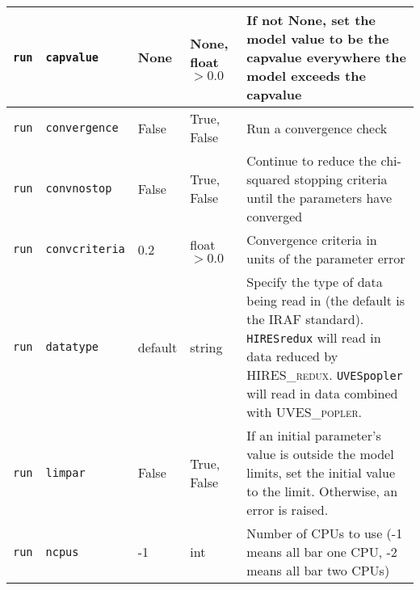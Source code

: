 \begin{center}
\begin{longtable}{p{1.5cm}p{2.5cm}p{2.0cm}p{2.0cm}p{5.0cm}}
\multicolumn{1}{p{1.5cm}}{\texttt{run}} &
\multicolumn{1}{p{2.5cm}}{\texttt{capvalue}} &
\multicolumn{1}{p{2.0cm}}{None} &
\multicolumn{1}{p{2.0cm}}{None, float $>0.0$} &
\multicolumn{1}{p{5.0cm}}{If not None, set the model value to be the capvalue everywhere the model exceeds the capvalue} \\ \midrule

\multicolumn{1}{p{1.5cm}}{\texttt{run}} &
\multicolumn{1}{p{2.5cm}}{\texttt{convergence}} &
\multicolumn{1}{p{2.0cm}}{False} &
\multicolumn{1}{p{2.0cm}}{True, False} &
\multicolumn{1}{p{5.0cm}}{Run a convergence check} \\ \midrule

\multicolumn{1}{p{1.5cm}}{\texttt{run}} &
\multicolumn{1}{p{2.5cm}}{\texttt{convnostop}} &
\multicolumn{1}{p{2.0cm}}{False} &
\multicolumn{1}{p{2.0cm}}{True, False} &
\multicolumn{1}{p{5.0cm}}{Continue to reduce the chi-squared stopping criteria until the parameters have converged} \\ \midrule

\multicolumn{1}{p{1.5cm}}{\texttt{run}} &
\multicolumn{1}{p{2.5cm}}{\texttt{convcriteria}} &
\multicolumn{1}{p{2.0cm}}{0.2} &
\multicolumn{1}{p{2.0cm}}{float $>0.0$} &
\multicolumn{1}{p{5.0cm}}{Convergence criteria in units of the parameter error} \\ \midrule

\multicolumn{1}{p{1.5cm}}{\texttt{run}} &
\multicolumn{1}{p{2.5cm}}{\texttt{datatype}} &
\multicolumn{1}{p{2.0cm}}{default} &
\multicolumn{1}{p{2.0cm}}{string} &
\multicolumn{1}{p{5.0cm}}{Specify the type of data being read in (the default is the IRAF standard). \texttt{HIRESredux} will read in data reduced by \textsc{HIRES\_redux}. \texttt{UVESpopler} will read in data combined with \textsc{UVES\_popler}.} \\ \midrule

\multicolumn{1}{p{1.5cm}}{\texttt{run}} &
\multicolumn{1}{p{2.5cm}}{\texttt{limpar}} &
\multicolumn{1}{p{2.0cm}}{False} &
\multicolumn{1}{p{2.0cm}}{True, False} &
\multicolumn{1}{p{5.0cm}}{If an initial parameter's value is outside the model limits, set the initial value to the limit. Otherwise, an error is raised.} \\ \midrule

\multicolumn{1}{p{1.5cm}}{\texttt{run}} &
\multicolumn{1}{p{2.5cm}}{\texttt{ncpus}} &
\multicolumn{1}{p{2.0cm}}{-1} &
\multicolumn{1}{p{2.0cm}}{int} &
\multicolumn{1}{p{5.0cm}}{Number of CPUs to use (-1 means all bar one CPU, -2 means all bar two CPUs)} \\ \midrule


\end{longtable}
\end{center}

